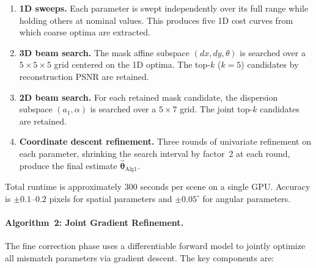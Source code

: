 \begin{enumerate}
  \item \textbf{1D sweeps.}  Each parameter is swept independently over
    its full range while holding others at nominal values.  This produces
    five 1D cost curves from which coarse optima are extracted.
  \item \textbf{3D beam search.}  The mask affine subspace
    $(dx, dy, \theta)$ is searched over a $5 \times 5 \times 5$ grid
    centered on the 1D optima.  The top-$k$ ($k = 5$) candidates by
    reconstruction PSNR are retained.
  \item \textbf{2D beam search.}  For each retained mask candidate,
    the dispersion subspace $(a_1, \alpha)$ is searched over a
    $5 \times 7$ grid.  The joint top-$k$ candidates are retained.
  \item \textbf{Coordinate descent refinement.}  Three rounds of
    univariate refinement on each parameter, shrinking the search
    interval by factor~2 at each round, produce the final estimate
    $\hat{\boldsymbol{\theta}}_{\text{Alg1}}$.
\end{enumerate}

Total runtime is approximately 300 seconds per scene on a single GPU.
Accuracy is $\pm 0.1$--$0.2$ pixels for spatial parameters and
$\pm 0.05^\circ$ for angular parameters.

\paragraph{Algorithm~2: Joint Gradient Refinement.}
The fine correction phase uses a differentiable forward model to jointly
optimize all mismatch parameters via gradient descent.  The key components
are:

